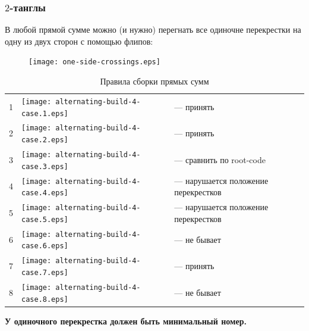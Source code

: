 \documentclass[dvips, intlimits, 9pt, unicode, notheorems, color=usenames,dvipsnames]{beamer}
\theoremstyle{plain}
\theoremstyle{definition}
\begin{document}
	\begin{frame}
		\frametitle{$2$-танглы}

		В любой прямой сумме можно (и нужно) перегнать все одиночне перекрестки на одну из двух сторон с помощью флипов:
		\begin{figure}[ht]
			\centering
			\texttt{[image: one-side-crossings.eps]}
		\end{figure}

		\vspace{-6mm}
		\begin{table}[ht]
			\caption{Правила сборки прямых сумм\label{table:sums-rules}}
			\centering
			\begin{tabular}{cm{22mm}l}
				\hline
				1 & \texttt{[image: alternating-build-4-case.1.eps]} & --- принять \\
				2 & \texttt{[image: alternating-build-4-case.2.eps]} & --- принять \\
				3 & \texttt{[image: alternating-build-4-case.3.eps]} & --- сравнить по root-code \\
				4 & \texttt{[image: alternating-build-4-case.4.eps]} & --- нарушается положение перекрестков \\
				5 & \texttt{[image: alternating-build-4-case.5.eps]} & --- нарушается положение перекрестков \\
				6 & \texttt{[image: alternating-build-4-case.6.eps]} & --- не бывает \\
				7 & \texttt{[image: alternating-build-4-case.7.eps]} & --- принять \\
				8 & \texttt{[image: alternating-build-4-case.8.eps]} & --- не бывает \\
				\hline
			\end{tabular}
		\end{table}

		\begin{center}
			{\bf У одиночного перекрестка должен быть минимальный номер.}
		\end{center}
	\end{frame}
\end{document}
